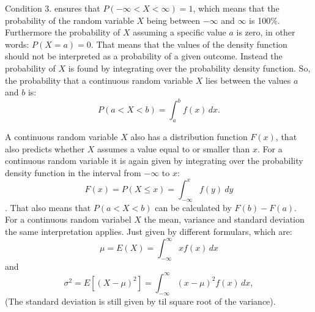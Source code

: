 	Condition 3. ensures that $P(-\infty < X < \infty) = 1$, which means that the probability of the random variable $X$ being between $-\infty$ and $\infty$ is 100\%. Furthermore the probability of $X$ assuming a specific value $a$ is zero, in other words: $P(X=a)=0$. That means that the values of the density function should not be interpreted as a probability of a given outcome. Instead the probability of $X$ is found by integrating over the probability density function. So, the probability that a continuous random variable $X$ lies between the values $a$ and $b$ is: 
	$$P(a < X < b) = \int_a^b f(x) \, dx.$$
	
	A continuous random variable $X$ also has a distribution function $F(x)$, that also predicts whether $X$ assumes a value equal to or smaller than $x$. For a continuous random variable it is again given by integrating over the probability density function in the interval from $-\infty$ to $x$:
	$$F(x) = P(X \leq x) = \int_{-\infty}^{x} f(y) \ dy$$.
	That also means that $P(a<X<b)$ can be calculated by $F(b)-F(a)$.
	\\
	
	For a continuous random variabel $X$ the mean, variance and standard deviation the same interpretation applies. Just given by different formulars, which are:
	$$\mu = E(X) = \int_{-\infty}^{\infty} x f(x) \, dx$$
	and
	$$\sigma^2 = E\left[(X - \mu)^2\right] = \int_{-\infty}^{\infty} (x - \mu)^2 f(x) \, dx,$$
	(The standard deviation is still given by til square root of the variance).
	
	